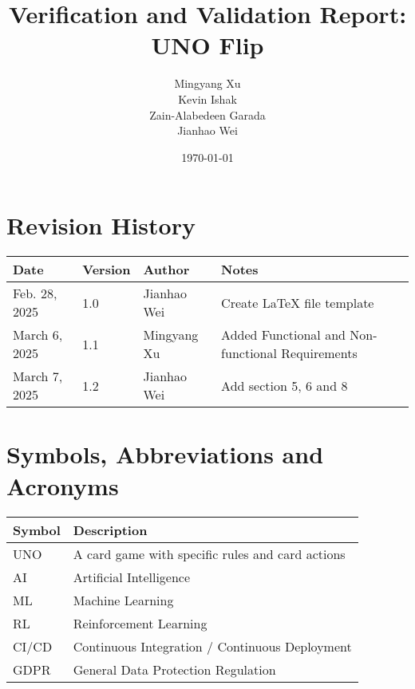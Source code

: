 \documentclass[12pt, titlepage]{article}
\begin{document}
\title{Verification and Validation Report: UNO Flip}
\author{Mingyang Xu\\ Kevin Ishak\\ Zain-Alabedeen Garada\\ Jianhao Wei\\}

\date{\today}

\maketitle


\section{Revision History}

\begin{tabularx}{\textwidth}{p{3cm}p{2cm}p{2cm}X}
\toprule {\bf Date} & {\bf Version} & {\bf Author}& {\bf Notes}\\
\midrule
Feb. 28, 2025 & 1.0 & Jianhao Wei & Create LaTeX file template \\
March 6, 2025 & 1.1 & Mingyang Xu & Added Functional and Non-functional Requirements\\
March 7, 2025 & 1.2 & Jianhao Wei & Add section 5, 6 and 8\\

\bottomrule
\end{tabularx}

\newpage

\section{Symbols, Abbreviations and Acronyms}

\renewcommand{\arraystretch}{1.2}
\begin{tabular}{l l} 
  \toprule		
  \textbf{Symbol} & \textbf{Description}\\
  \midrule 
  UNO & A card game with specific rules and card actions\\
  AI & Artificial Intelligence\\
  ML & Machine Learning\\
  RL & Reinforcement Learning\\
  CI/CD & Continuous Integration / Continuous Deployment\\
  GDPR & General Data Protection Regulation\\
  \bottomrule
\end{tabular}\
\end{document}
